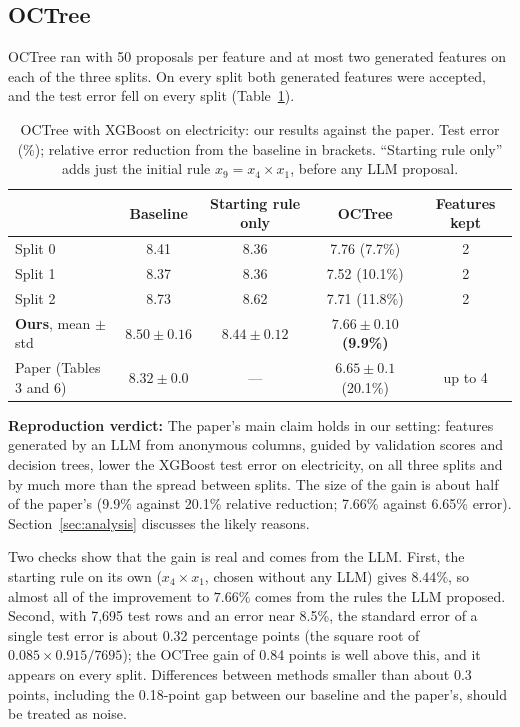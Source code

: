 \documentclass[11pt]{article}
\begin{document}
\subsection{OCTree}
OCTree ran with 50 proposals per feature and at most two generated features on each of the three
splits. On every split both generated features were accepted, and the test error fell on every
split (Table~\ref{tab:octree}).

\begin{table}[H]
\centering
\caption{OCTree with XGBoost on electricity: our results against the paper. Test error (\%); relative
error reduction from the baseline in brackets. ``Starting rule only'' adds just the initial rule
$x_9=x_4\times x_1$, before any LLM proposal.}
\label{tab:octree}
\begin{tabular}{@{}lcccc@{}}
\toprule
 & Baseline & Starting rule only & OCTree & Features kept \\
\midrule
Split 0 & 8.41 & 8.36 & 7.76 (7.7\%) & 2 \\
Split 1 & 8.37 & 8.36 & 7.52 (10.1\%) & 2 \\
Split 2 & 8.73 & 8.62 & 7.71 (11.8\%) & 2 \\
\midrule
\textbf{Ours}, mean $\pm$ std & $8.50\pm0.16$ & $8.44\pm0.12$ & \textbf{$7.66\pm0.10$} \textbf{(9.9\%)} & \\
Paper (Tables 3 and 6) & $8.32\pm0.0$ & --- & $6.65\pm0.1$ (20.1\%) & up to 4 \\
\bottomrule
\end{tabular}
\end{table}

\textbf{Reproduction verdict:} The paper's main claim holds in our setting: features generated by an
LLM from anonymous columns, guided by validation scores and decision trees, lower the XGBoost test
error on electricity, on all three splits and by much more than the spread between splits. The size
of the gain is about half of the paper's (9.9\% against 20.1\% relative reduction; 7.66\% against
6.65\% error). Section~\ref{sec:analysis} discusses the likely reasons.

Two checks show that the gain is real and comes from the LLM. First, the starting rule on its own
($x_4\times x_1$, chosen without any LLM) gives $8.44\%$, so almost all of the improvement to
$7.66\%$ comes from the rules the LLM proposed. Second, with 7,695 test rows and an error near
8.5\%, the standard error of a single test error is about
0.32 percentage points (the square root of $0.085\times0.915/7695$); the OCTree gain of 0.84 points is well
above this, and it appears on every split. Differences between methods smaller than about 0.3 points,
including the 0.18-point gap between our baseline and the paper's, should be treated as noise.
\end{document}
